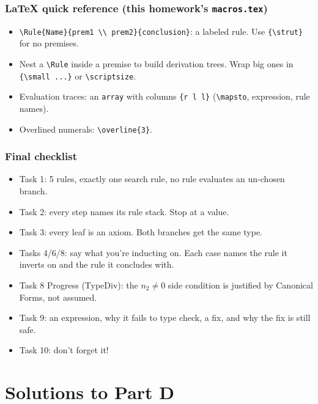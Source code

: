 \documentclass[11pt]{article}
\begin{document}
\section*{LaTeX quick reference (this homework's \texttt{macros.tex})}
\begin{itemize}
  \item \verb|\Rule{Name}{prem1 \\ prem2}{conclusion}|: a labeled rule. Use
        \verb|{\strut}| for no premises.
  \item Nest a \verb|\Rule| inside a premise to build derivation trees. Wrap
        big ones in \verb|{\small ...}| or \verb|\scriptsize|.
  \item Evaluation traces: an \verb|array| with columns
        \verb|{r l l}| (\verb|\mapsto|, expression, rule names).
  \item Overlined numerals: \verb|\overline{3}|.
\end{itemize}

\section*{Final checklist}
\begin{itemize}
  \item Task 1: 5 rules, exactly one search rule, no rule evaluates an
        un-chosen branch.
  \item Task 2: every step names its rule stack. Stop at a value.
  \item Task 3: every leaf is an axiom. Both branches get the same type.
  \item Tasks 4/6/8: say what you're inducting on. Each case names the
        rule it inverts on and the rule it concludes with.
  \item Task 8 Progress (TypeDiv): the $n_2\neq 0$ side condition is
        justified by Canonical Forms, not assumed.
  \item Task 9: an expression, why it fails to type check, a fix, and why
        the fix is still safe.
  \item Task 10: don't forget it!
\end{itemize}

\newpage
\part*{Solutions to Part D}
\end{document}
